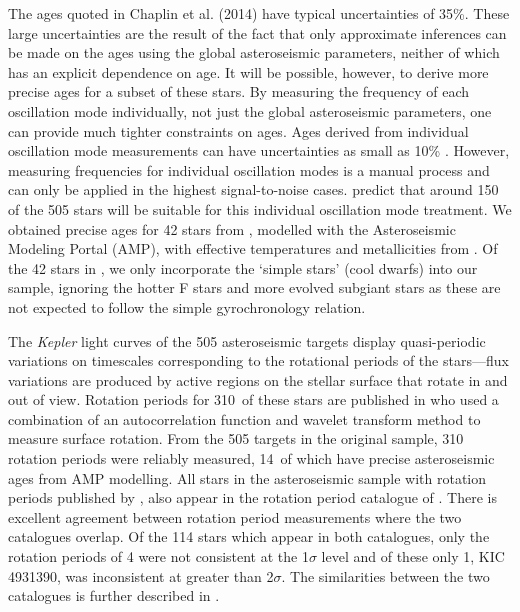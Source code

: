 \documentclass[useAMS, usenatbib]{mn2e}
\newcommand{\nastero}{310}
\newcommand{\nprecise}{14~}
\newcommand{\ngarcia}{310~}
\begin{document}
The ages quoted in Chaplin et al. (2014) have typical uncertainties of 35\%.
These large uncertainties are the result of the fact that only approximate
inferences can be made on the ages using the global asteroseismic parameters,
neither of which has an explicit dependence on age.
It will be possible, however, to derive more precise ages for a subset of
these stars.
By measuring the frequency of each oscillation mode individually,
not just the global asteroseismic parameters, one can provide much tighter
constraints on ages.
Ages derived from individual oscillation mode measurements can have
uncertainties as small as 10\% \citep{Brown1994, SilvaAguirre2013}.
However, measuring frequencies for individual oscillation modes is a manual
process and can only be applied in the highest signal-to-noise cases.
\citet{Chaplin2014} predict that around 150 of the 505 stars will be suitable
for this individual oscillation mode treatment.
We obtained precise ages for 42 stars from \citet{Metcalfe2014}, modelled with
the Asteroseismic Modeling Portal (AMP), with effective temperatures and
metallicities from \citet{Bruntt2012}.
Of the 42 stars in \citet{Metcalfe2014}, we only incorporate the `simple
stars' (cool dwarfs) into our sample, ignoring the hotter F stars and more
evolved subgiant stars as these are not expected to follow the simple
gyrochronology relation.

The {\it Kepler} light curves of the 505 asteroseismic targets display
quasi-periodic variations on timescales corresponding to the rotational
periods of the stars---flux variations are produced by active regions on the
stellar surface that rotate in and out of view.
Rotation periods for \ngarcia of these stars are published in
\citet{Garcia2014} who used a combination of an autocorrelation function and
wavelet transform method to measure surface rotation.
From the 505 targets in the original sample, \nastero$~$rotation periods were
reliably measured, \nprecise of which have precise asteroseismic ages from AMP
modelling.
All stars in the asteroseismic sample with rotation periods published by
\citet{McQuillan_2014}, also appear in the rotation period catalogue of
\citet{Garcia2014}.
There is excellent agreement between rotation period
measurements where the two catalogues overlap.
Of the 114 stars which appear in both catalogues, only the rotation periods of
4 were not consistent at the 1$\sigma$ level and of these only 1, KIC 4931390,
was inconsistent at greater than 2$\sigma$.
The similarities between the two catalogues is further described in
\citet{Garcia2014}.  %
\end{document}
